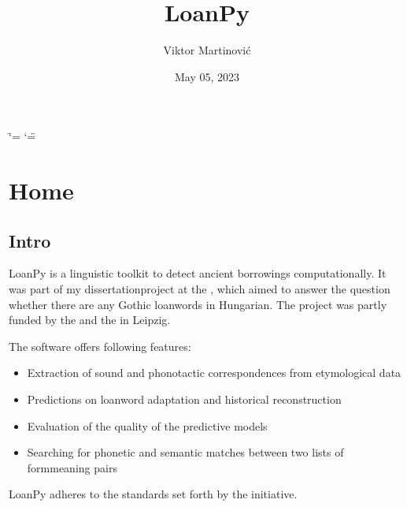 \documentclass[letterpaper,10pt,english]{sphinxmanual}
\title{LoanPy}
\date{May 05, 2023}
\author{Viktor Martinović}
\begin{document}
\ifdefined\shorthandoff
  \ifnum\catcode`\=\string=\active\shorthandoff{=}\fi
  \ifnum\catcode`\"=\active{}\fi
\fi

\pagestyle{empty}
\sphinxmaketitle
\pagestyle{plain}
\sphinxtableofcontents
\pagestyle{normal}
\label{\detokenize{index::doc}}


\sphinxstepscope


\chapter{Home}
\label{\detokenize{home:home}}\label{\detokenize{home::doc}}
\noindent{}


\section{Intro}
\label{\detokenize{home:intro}}
\sphinxAtStartPar
LoanPy is a linguistic toolkit to detect ancient borrowings computationally.
It was part of my dissertation\sphinxhyphen{}project at the ,
which aimed to answer the question whether there are any Gothic loanwords
in Hungarian. The project was partly funded by the
and the  in Leipzig.

\sphinxAtStartPar
The software offers following features:
\begin{itemize}
\item {} 
\sphinxAtStartPar
Extraction of sound and phonotactic correspondences from etymological data

\item {} 
\sphinxAtStartPar
Predictions on loanword adaptation and historical reconstruction

\item {} 
\sphinxAtStartPar
Evaluation of the quality of the predictive models

\item {} 
\sphinxAtStartPar
Searching for phonetic and semantic matches between two lists of
form\sphinxhyphen{}meaning pairs

\end{itemize}

\sphinxAtStartPar
LoanPy adheres to the standards set forth by the  initiative.
\end{document}
